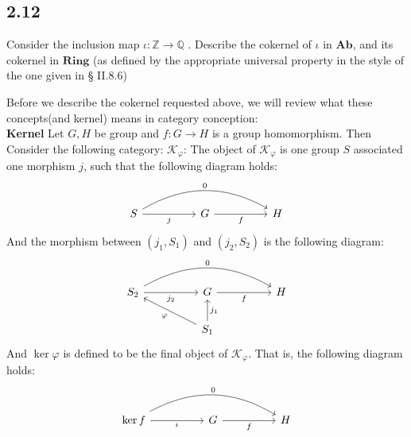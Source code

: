 \documentclass[a4paper, pdf, 12pt]{article}
\makeatletter
\renewenvironment{proof}[1][\proofname]{\par
  \pushQED{\qed}%
  \normalfont \topsep6\p@\@plus6\p@\relax
  \trivlist
  \item[%
    \hskip\labelsep
    \normalfont\bfseries %
    #1%
    \@addpunct{.}%
  ]\ignorespaces
}{%
  \popQED\endtrivlist\@endpefalse
}
\let\qed\relax %
\DeclareRobustCommand{\qed}{%
  \ifmmode \mathqed
  \else
    \leavevmode\unskip\penalty\@M\hbox{}\nobreak\hspace{.5em minus .1em}%
    \hbox{\qedsymbol}%
  \fi
}
\makeatother
\begin{document}
\subsection*{2.12}
Consider the inclusion map $\iota: \mathbb{Z} \rightarrow \mathbb{Q}$ . Describe the cokernel of $\iota$ in $\mathbf{Ab}$, 
and its cokernel in $\mathbf{Ring}$ (as deﬁned by the appropriate universal property in the style of the one given in § II.8.6)
\begin{proof}
  Before we describe the cokernel requested above, we will review what these concepts(and kernel) means in category 
  conception:\\
  \textbf{Kernel} Let $G, H$ be group and $f: G\rightarrow H$ is a group homomorphism. Then Consider the following 
  category: $\mathscr{K}_{\varphi}$: The object of $\mathscr{K}_{\varphi}$ is one group $S$ associated one morphism $j$, such that 
  the following diagram holds:
  $$
  \begin{tikzcd}[column sep=huge]
  S \arrow[r, "j"'] \arrow[rr, "0", bend left] & G \arrow[r, "f"'] & H
  \end{tikzcd}
  $$
  And the morphism between $(j_1, S_1)$ and $(j_2, S_2)$ is the following diagram:
  $$
\begin{tikzcd}[column sep=huge]
  S_2 \arrow[r, "j_2"'] \arrow[rr, "0", bend left] & G \arrow[r, "f"']                     & H \\
                                                   & S_1 \arrow[u, "j_1"'] \arrow[lu, "\varphi"] &  
  \end{tikzcd}
  $$
  And $\ker \varphi$ is defined to be the final object of $\mathscr{K}_{\varphi}$. That is, the following diagram holds:
  $$
  \begin{tikzcd}[column sep=huge, ]
  \ker f \arrow[r, "\iota"'] \arrow[rr, "0", bend left] & G \arrow[r, "f"']                               & H \\

\end{tikzcd}$$
\end{proof}
\end{document}
